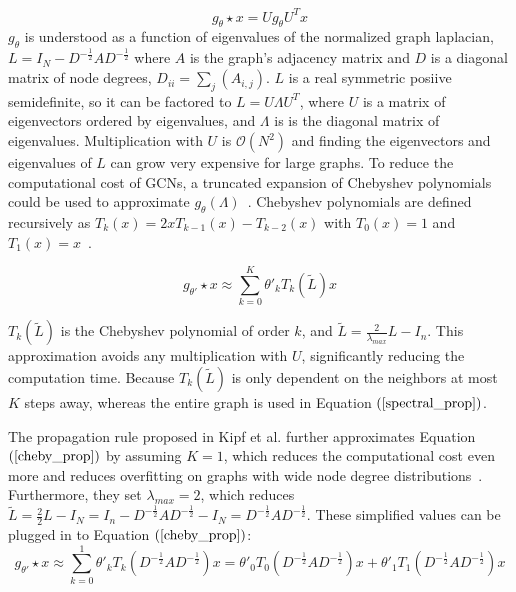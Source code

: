 \documentclass{article}
\begin{document}
\begin{equation}
\label{spectral_prop}
g_\theta \star x = Ug_\theta U^Tx
\end{equation}
$g_\theta$ is understood as a function of eigenvalues of the normalized graph laplacian, $L = I_N - D^{-\frac{1}{2}}AD^{-\frac{1}{2}}$ where $A$ is the graph's adjacency matrix and $D$ is a diagonal matrix of node degrees, $D_{ii} = \sum_{j} (A_{i,j})$. $L$ is a real symmetric posiive semidefinite, so it can be factored to $L = U\Lambda U^T$, where $U$ is a matrix of eigenvectors ordered by eigenvalues, and $\Lambda$ is is the diagonal matrix of eigenvalues.  Multiplication with $U$ is $\mathcal{O}(N^2) $ and finding the eigenvectors and eigenvalues of $L$ can grow very expensive for large graphs. To reduce the computational cost of GCNs, a truncated expansion of Chebyshev polynomials could be used to approximate $g_\theta (\Lambda)$~\cite{Defferrard2016}.
Chebyshev polynomials are defined recursively as $T_k(x) = 2xT_{k-1}(x) - T_{k-2}(x)$ with $T_0(x) = 1$ and $T_1(x) = x$~\cite{Hammond2011}.

\begin{equation}
\label{cheby_prop}
g_{\theta'} \star x \approx \sum\limits_{k=0}^{K} \theta'_k T_k (\tilde{L})x
\end{equation}

$T_k(\tilde{L})$ is the Chebyshev polynomial of order $k$, and $\tilde{L} = \frac{2}{\lambda_{max}} L - I_n$. This approximation avoids any multiplication with $U$, significantly reducing the computation time. Because $T_k(\tilde{L})$ is only dependent on the neighbors at most $K$ steps away, whereas the entire graph is used in Equation $(\ref{spectral_prop})$.

The propagation rule proposed in Kipf et al. further approximates Equation 
$(\ref{cheby_prop})$ by assuming $K = 1$, which reduces the computational cost even more and reduces overfitting on graphs with wide node degree distributions~\cite{Kipf2016}. Furthermore, they set $\lambda_{max} = 2$, which reduces $\tilde{L} = \frac{2}{2}L - I_N = I_n - D^{-\frac{1}{2}}AD^{-\frac{1}{2}} - I_N = D^{-\frac{1}{2}}AD^{-\frac{1}{2}}$.  These simplified values can be plugged in to Equation $(\ref{cheby_prop})$:
\begin{equation}
\label{reduce_k}
g_{\theta'} \star x \approx \sum\limits_{k=0}^{1} \theta'_k T_k (D^{-\frac{1}{2}}AD^{-\frac{1}{2}})x = \theta'_0 T_0(D^{-\frac{1}{2}}AD^{-\frac{1}{2}})x + \theta'_1 T_1(D^{-\frac{1}{2}}AD^{-\frac{1}{2}})x 
\end{equation}
\end{document}
